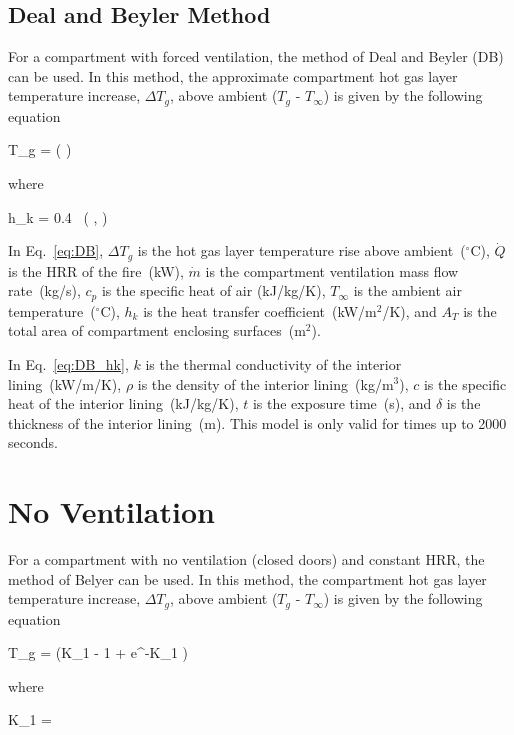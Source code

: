 \clearpage


\subsection{Deal and Beyler Method}

For a compartment with forced ventilation, the method of Deal and Beyler (DB) can be used. In this method, the approximate compartment hot gas layer temperature increase, $\Delta T_g$, above ambient ($T_g$ - $T_\infty$) is given by the following equation

\be
\Delta T_g = \left(  \right)
\label{eq:DB}
\ee

\noindent where

\be
h_k = 0.4\  \left(  ,  \right)
\label{eq:DB_hk}
\ee

In Eq.~\ref{eq:DB}, $\Delta T_g$ is the hot gas layer temperature rise above ambient~($^\circ$C), $\dot Q$ is the HRR of the fire~(kW), $\dot m$ is the compartment ventilation mass flow rate~(kg/s), $c_p$ is the specific heat of air (kJ/kg/K), $T_\infty$ is the ambient air temperature~($^\circ$C), $h_k$ is the heat transfer coefficient~(kW/m$^2$/K), and $A_T$ is the total area of compartment enclosing surfaces~(m$^2$).

In Eq.~\ref{eq:DB_hk}, $k$ is the thermal conductivity of the interior lining~(kW/m/K), $\rho$ is the density of the interior lining~(kg/m$^3$), $c$ is the specific heat of the interior lining~(kJ/kg/K), $t$ is the exposure time~(s), and $\delta$ is the thickness of the interior lining~(m). This model is only valid for times up to 2000 seconds.



\clearpage


\section{No Ventilation}

For a compartment with no ventilation (closed doors) and constant HRR, the method of Belyer can be used. In this method, the compartment hot gas layer temperature increase, $\Delta T_g$, above ambient ($T_g$ - $T_\infty$) is given by the following equation

\be
\Delta T_g =  (K_1  - 1 + e^{-K_1 })
\label{eq:Beyler}
\ee

\noindent where

\be
K_1 = 
\label{eq:Beyler_K1}
\ee

